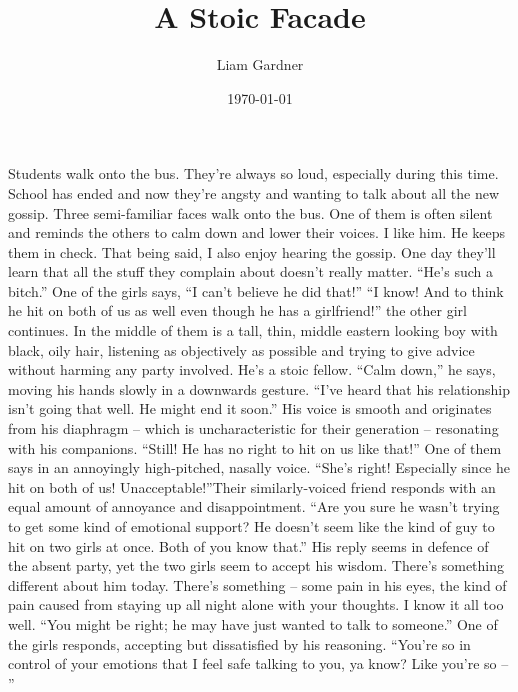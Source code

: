 \documentclass[a4paper, 12pt]{book}
\title{A Stoic Facade}
\author{Liam Gardner}
\date{\today}
\newcommand\tab[1][1cm]{\hspace*{#1}}
\begin{document}
\maketitle
\tab
Students walk onto the bus. They’re always so loud, especially during this time. School has ended and now they’re angsty and wanting to talk about all the new gossip. Three semi-familiar faces walk onto the bus. One of them is often silent and reminds the others to calm down and lower their voices. I like him. He keeps them in check. That being said, I also enjoy hearing the gossip. One day they’ll learn that all the stuff they complain about doesn’t really matter.
\newline
\tab
``He’s such a bitch.'' One of the girls says, ``I can’t believe he did that!''
\newline
\tab
``I know! And to think he hit on both of us as well even though he has a girlfriend!'' the other girl continues.
\newline
\tab
In the middle of them is a tall, thin, middle eastern looking boy with black, oily hair, listening as objectively as possible and trying to give advice without harming any party involved. He’s a stoic fellow. ``Calm down,'' he says, moving his hands slowly in a downwards gesture. ``I’ve heard that his relationship isn’t going that well. He might end it soon.'' His voice is smooth and originates from his diaphragm -- which is uncharacteristic for their generation -- resonating with his companions.
\newline
\tab
``Still! He has no right to hit on us like that!'' One of them says in an annoyingly high-pitched, nasally voice.
\newline
\tab
``She’s right! Especially since he hit on both of us! Unacceptable!''Their similarly-voiced friend responds with an equal amount of annoyance and disappointment.
\newline
\tab
``Are you sure he wasn’t trying to get some kind of emotional support? He doesn’t seem like the kind of guy to hit on two girls at once. Both of you know that.'' His reply seems in defence of the absent party, yet the two girls seem to accept his wisdom. There’s something different about him today. There’s something -- some pain in his eyes, the kind of pain caused from staying up all night alone with your thoughts. I know it all too well.
\newline
\tab
``You might be right; he may have just wanted to talk to someone.'' One of the girls responds, accepting but dissatisfied by his reasoning. ``You’re so in control of your emotions that I feel safe talking to you, ya know? Like you’re so -- ''
\end{document}
